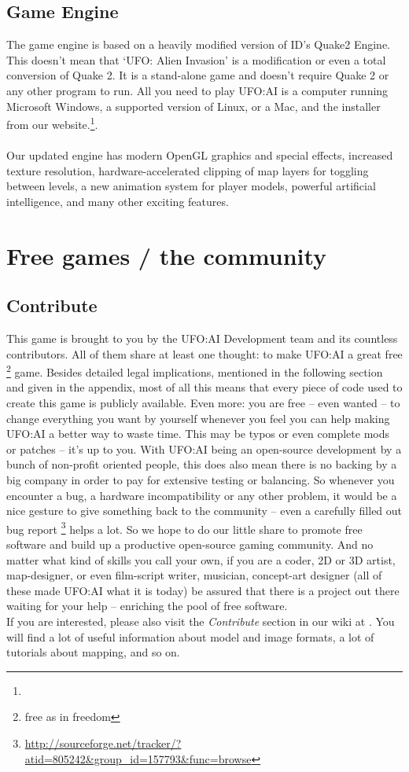 \subsection{Game Engine}
The game engine is based on a heavily modified version of ID's Quake2 Engine. This doesn't mean that `UFO: Alien Invasion' is a modification or even a total conversion of Quake 2. It is a stand-alone game and doesn't require Quake 2 or any other program to run. All you need to play UFO:AI is a computer running Microsoft Windows, a supported version of Linux, or a Mac, and the installer from our website.\footnote{\ufohomepage}.\\
\\
Our updated engine has modern OpenGL graphics and special effects, increased texture resolution, hardware-accelerated clipping of map layers for toggling between levels, a new animation system for player models, powerful artificial intelligence, and many other exciting features.

\section{Free games / the community}
\subsection{Contribute}
This game is brought to you by the UFO:AI Development team and its countless contributors. All of them share at least one thought: to make UFO:AI a great free \footnote{free as in freedom} game. Besides detailed legal implications, mentioned in the following section and given in the appendix, most of all this means that every piece of code used to create this game is publicly available. Even more: you are free -- even wanted -- to change everything you want by yourself whenever you feel you can help making UFO:AI a better way to waste time. This may be typos or even complete mods or patches -- it's up to you. With UFO:AI being an open-source development by a bunch of non-profit oriented people, this does also mean there is no backing by a big company in order to pay for extensive testing or balancing. So whenever you encounter a bug, a hardware incompatibility or any other problem, it would be a nice gesture to give something back to the community -- even a carefully filled out bug report \footnote{\url{http://sourceforge.net/tracker/?atid=805242&group_id=157793&func=browse}} helps a lot. So we hope to do our little share to promote free software and build up a productive open-source gaming community. And no matter what kind of skills you call your own, if you are a coder, 2D or 3D artist, map-designer, or even film-script writer, musician, concept-art designer (all of these made UFO:AI what it is today) be assured that there is a project out there waiting for your help -- enriching the pool of free software.\\
If you are interested, please also visit the \textit{Contribute} section in our wiki at \ufohomepage. You will find a lot of useful information about model and image formats, a lot of tutorials about mapping, and so on.

